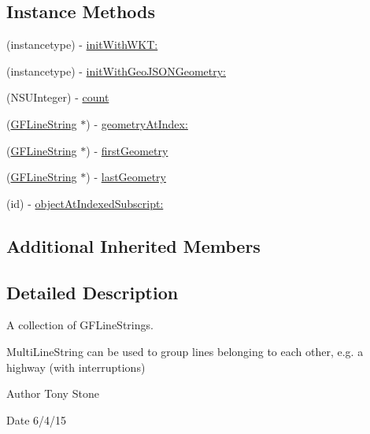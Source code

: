 \subsection*{Instance Methods}
\begin{DoxyCompactItemize}
\item 
(instancetype) -\/ \hyperlink{interface_g_f_multi_line_string_a23cca8dc30634c3ac23c8cfaca41c569}{init\+With\+W\+K\+T\+:}
\item 
(instancetype) -\/ \hyperlink{interface_g_f_multi_line_string_a35fba00c08f785e70b47dda5067f84f8}{init\+With\+Geo\+J\+S\+O\+N\+Geometry\+:}
\item 
(N\+S\+U\+Integer) -\/ \hyperlink{interface_g_f_multi_line_string_a49494350a429df86186d111b5496d66c}{count}
\item 
(\hyperlink{interface_g_f_line_string}{G\+F\+Line\+String} $\ast$) -\/ \hyperlink{interface_g_f_multi_line_string_a6724df65ee49b15e8778f965d3498bcb}{geometry\+At\+Index\+:}
\item 
(\hyperlink{interface_g_f_line_string}{G\+F\+Line\+String} $\ast$) -\/ \hyperlink{interface_g_f_multi_line_string_a78586818fa6ddbce9c3cf2032eba7f2d}{first\+Geometry}
\item 
(\hyperlink{interface_g_f_line_string}{G\+F\+Line\+String} $\ast$) -\/ \hyperlink{interface_g_f_multi_line_string_a807c900c20062193febb780e4ecc6abd}{last\+Geometry}
\item 
(id) -\/ \hyperlink{interface_g_f_multi_line_string_af890018703b1499460cc379a1f498ea0}{object\+At\+Indexed\+Subscript\+:}
\end{DoxyCompactItemize}
\subsection*{Additional Inherited Members}


\subsection{Detailed Description}
A collection of G\+F\+Line\+Strings. 

Multi\+Line\+String can be used to group lines belonging to each other, e.\+g. a highway (with interruptions)

\begin{DoxyAuthor}{Author}
Tony Stone 
\end{DoxyAuthor}
\begin{DoxyDate}{Date}
6/4/15 
\end{DoxyDate}



